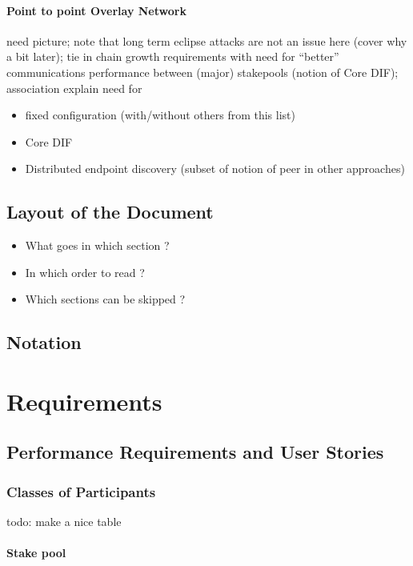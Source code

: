 \documentclass{report}
\theoremstyle{definition}{
  \newtheorem{lemma}{Lemma}[section] %
  \newtheorem{definition}[lemma]{Definition}
}
\theoremstyle{theorem}{
  \newtheorem{invariant}[lemma]{Invariant}
  \newtheorem{proofobligation}[lemma]{Proof Obligation}
}
\numberwithin{equation}{lemma}
\begin{document}
\subsubsection{Point to point Overlay Network}
need picture; note that long term eclipse attacks are not an issue
here (cover why a bit later); tie in chain growth requirements with
need for ``better'' communications performance between (major)
stakepools (notion of Core DIF); association explain need for
\begin{itemize}
\item fixed configuration (with/without others from this list)
\item Core DIF
\item Distributed endpoint discovery (subset of notion of peer in
  other approaches)
\end{itemize}

  
\section{Layout of the Document}

\begin{itemize}
  \item What goes in which section ?
  \item In which order to read ?
  \item Which sections can be skipped ?
\end{itemize}

\section{Notation}

\chapter{Requirements}

\section{Performance Requirements and User Stories}
\subsection{Classes of Participants}
todo: make a nice table
\subsubsection{Stake pool} %
\end{document}
